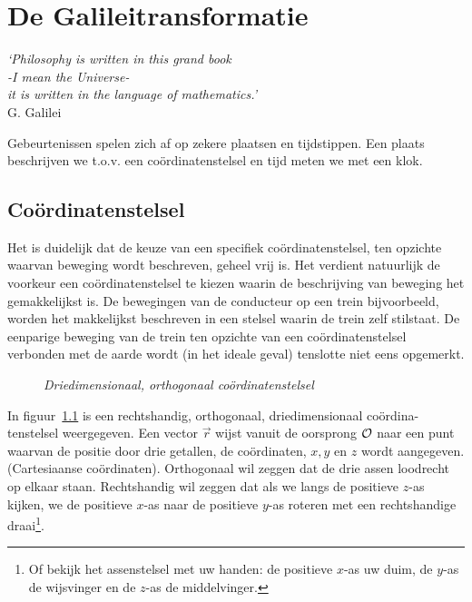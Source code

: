 \chapter{De Galileitransformatie}
\vspace{-1cm}\begin{flushright}
{\it `Philosophy is written in this grand book \\-I mean the
  Universe-\\it is written in the language of mathematics.'}\\
 G. Galilei\end{flushright}
Gebeurtenissen spelen zich af op zekere plaatsen en tijdstippen.
Een plaats beschrijven we t.o.v. een co\"{o}rdinatenstelsel en tijd meten we 
met een klok.


\section{Co\"ordinatenstelsel}
Het is duidelijk dat de keuze van een specifiek co\"ordinatenstelsel,
ten opzichte waarvan beweging wordt beschreven, geheel vrij is. Het
verdient natuurlijk de voorkeur een co\"ordinatenstelsel te kiezen
waarin de beschrijving van beweging het gemakkelijkst is. De
bewegingen van de conducteur op een trein bijvoorbeeld, worden het
makkelijkst beschreven in een stelsel waarin de trein zelf
stilstaat. De eenparige beweging van de trein ten opzichte van
een co\"ordinatenstelsel verbonden met de aarde wordt (in het ideale
geval) tenslotte niet eens opgemerkt.


\begin{figure}[ht]
\centering
{}
\caption{{\sl Driedimensionaal, orthogonaal co\"{o}rdinatenstelsel}}
\label{f:galilei1}
\end{figure}


In figuur~\ref{f:galilei1} is een rechtshandig, orthogonaal,
driedimensionaal co\"{o}rdina-tenstelsel weergegeven.  Een vector
$\vec{r}$ wijst vanuit de oorsprong ${\cal O}$ naar een punt waarvan
de positie door drie getallen, de co\"{o}rdinaten, $x, y$ en $z$ wordt
aangegeven.  (Cartesiaanse co\"ordinaten). Orthogonaal wil zeggen dat de
drie assen loodrecht op elkaar staan.  Rechtshandig wil zeggen dat als
we langs de positieve $z$-as kijken, we de positieve $x$-as naar de
positieve $y$-as roteren met een rechtshandige draai\footnote{Of
bekijk het assenstelsel met uw handen: de positieve $x$-as uw duim, de
$y$-as de wijsvinger en de $z$-as de middelvinger.}.

